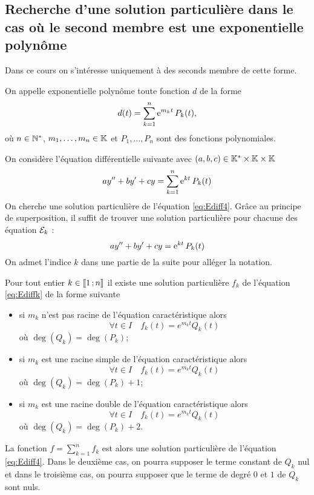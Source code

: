 \subsection{Recherche d'une solution particulière dans le cas où le second membre est une \og exponentielle polynôme \fg}
\label{subsec:recherchesolutionpartexppol}
Dans ce cours on s'intéresse uniquement à des seconds membre de cette forme.
\begin{defdef}
  On appelle exponentielle polynôme toute fonction \(d\) de la forme
  \begin{equation}
    d(t)=\sum_{k=1}^{n} \operatorname{e}^{m_k t} P_k (t),
  \end{equation}
où \(n \in \mathbb{N}^*\), \(m_1, \ldots, m_n \in \mathbb{K}\) et \( P_1, \ldots, P_n\) sont des fonctions polynomiales. 
\end{defdef}
On considère l'équation différentielle  suivante avec \((a,b,c) \in \mathbb{K}^{*}\times\mathbb{K}\times\mathbb{K}\)
\begin{equation}
  \label{eq:Ediff4}
  ay''+by'+cy=\sum_{k=1}^{n} \operatorname{e}^{kt} P_k(t)
\end{equation}
On cherche une solution particulière de l'équation \eqref{eq:Ediff4}. Grâce au principe de superposition, il suffit de trouver une solution particulière pour chacune des équation \(\mathcal{E}_k\) : 
\begin{equation}
  \label{eq:Ediffk}
  ay''+by'+cy= \operatorname{e}^{kt} P_k(t)
\end{equation}
On admet l'indice \(k\) dans une partie de la suite pour alléger la notation.
\begin{theo}
  Pour tout entier \(k \in \mathopen{\llbracket}1\mathclose{}\mathpunct{};n\mathclose{\rrbracket}\) il existe une solution particulière \(f_k\) de l'équation \eqref{eq:Ediffk} de la forme suivante
  \begin{itemize}
  \item si \(m_k\) n'est pas racine de l'équation caractéristique alors
    \begin{equation}
      \forall t \in I \quad f_k(t)=e^{m_k t} Q_k(t)
    \end{equation}
    où \(\deg(Q_k)=\deg(P_k)\);
  \item si \(m_k\) est une racine simple de l'équation caractéristique alors 
    \begin{equation}
      \forall t \in I \quad f_k(t)=e^{m_k t} Q_k(t)
    \end{equation}
    où \(\deg(Q_k)=\deg(P_k)+1\);
  \item si \(m_k\) est une racine double de l'équation caractéristique alors 
    \begin{equation}
      \forall t \in I \quad f_k(t)=e^{m_k t} Q_k(t)
    \end{equation}
    où \(\deg(Q_k)=\deg(P_k)+2\).
  \end{itemize}
La fonction \(f=\sum_{k=1}^{n} f_k\) est alors une solution particulière de l'équation \eqref{eq:Ediff4}. Dans le deuxième cas, on pourra supposer le terme constant de \(Q_k\) nul et dans le troisième cas, on pourra supposer que le terme de degré \(0\) et \(1\) de \(Q_k\) sont nuls.
\end{theo}
